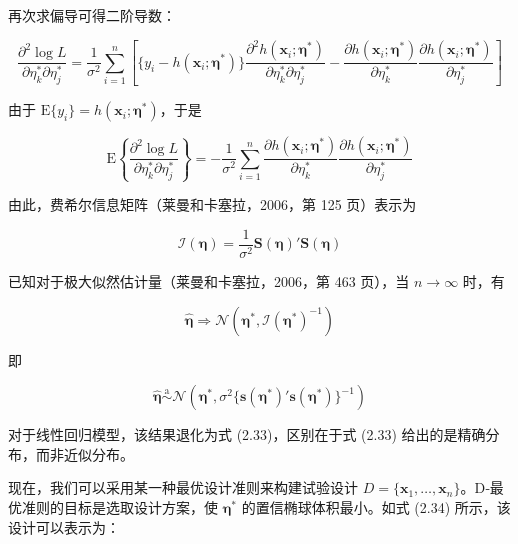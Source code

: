 \documentclass{ctexart}
\begin{document}
再次求偏导可得二阶导数：

\begin{equation*}
\frac{\partial^2\log L}{\partial\eta_k^*\partial\eta_j^*}=\frac{1}{\sigma^2}\sum_{i=1}^{n}\left[\{y_i-h(\boldsymbol{x}_i;\boldsymbol{\eta}^*)\}\frac{\partial^2 h(\boldsymbol{x}_i;\boldsymbol{\eta}^*)}{\partial\eta_k^*\partial\eta_j^*}-\frac{\partial h(\boldsymbol{x}_i;\boldsymbol{\eta}^*)}{\partial\eta_k^*}\frac{\partial h(\boldsymbol{x}_i;\boldsymbol{\eta}^*)}{\partial\eta_j^*}\right]
\end{equation*}

由于 $\mathrm{E}\{y_i\}=h(\boldsymbol{x}_i;\boldsymbol{\eta}^*)$，于是

\begin{equation*}
\mathrm{E}\left\{\frac{\partial^2\log L}{\partial\eta_k^*\partial\eta_j^*}\right\}=-\frac{1}{\sigma^2}\sum_{i=1}^{n}\frac{\partial h(\boldsymbol{x}_i;\boldsymbol{\eta}^*)}{\partial\eta_k^*}\frac{\partial h(\boldsymbol{x}_i;\boldsymbol{\eta}^*)}{\partial\eta_j^*}
\end{equation*}

由此，费希尔信息矩阵（莱曼和卡塞拉，2006，第 125 页）表示为

\begin{equation*}
\mathcal{I}(\boldsymbol{\eta})=\frac{1}{\sigma^2}\boldsymbol{S}(\boldsymbol{\eta})'\boldsymbol{S}(\boldsymbol{\eta})
\tag{9.9}
\end{equation*}

已知对于极大似然估计量（莱曼和卡塞拉，2006，第 463 页），当 $n\to\infty$ 时，有

\begin{equation*}
\widehat{\boldsymbol{\eta}}\Rightarrow\mathcal{N}(\boldsymbol{\eta}^{*},\mathcal{I}(\boldsymbol{\eta}^{*})^{-1})
\end{equation*}

即

\begin{equation*}
\widehat{\boldsymbol{\eta}}\stackrel{\mathrm{a}}{\sim}\mathcal{N}(\boldsymbol{\eta}^{*},\sigma^2\{\boldsymbol{s}(\boldsymbol{\eta}^{*})'\boldsymbol{s}(\boldsymbol{\eta}^{*})\}^{-1})
\end{equation*}

对于线性回归模型，该结果退化为式 (2.33)，区别在于式 (2.33) 给出的是精确分布，而非近似分布。

现在，我们可以采用某一种最优设计准则来构建试验设计 $D=\{\boldsymbol{x}_1,\dots,\boldsymbol{x}_n\}$。D‑最优准则的目标是选取设计方案，使 $\boldsymbol{\eta}^*$ 的置信椭球体积最小。如式 (2.34) 所示，该设计可以表示为：
\end{document}
